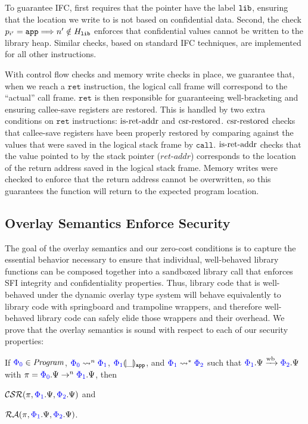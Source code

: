 To guarantee IFC, \redOstore{} first requires that the pointer have the label
$\mathtt{lib}$, ensuring that the location we write to is not based on confidential
data.
%
Second, the check $p_{i'} = \mathtt{app} \Longrightarrow n' \notin H_{\mathtt{lib}}$
enforces that confidential values cannot be written to the library heap.
%
Similar checks, based on standard IFC techniques, are implemented for all other
instructions.

%
With control flow checks and memory write checks in place, we guarantee that,
when we reach a $\mathtt{ret}$ instruction, the logical call frame will
correspond to the ``actual'' call frame.
%
$\mathtt{ret}$ is then responsible for guaranteeing well-bracketing and ensuring
callee-save registers are restored.
%
This is handled by two extra conditions on $\mathtt{ret}$ instructions:
$\operatorname{is-ret-addr}$ and $\operatorname{csr-restored}$.
%
$\operatorname{csr-restored}$ checks that callee-save registers have been
properly restored by comparing against the values that were saved in the
logical stack frame by $\mathtt{call}$.
%
$\operatorname{is-ret-addr}$ checks that the value pointed to by the stack pointer
($\mathit{ret\mbox{-}addr}$) corresponds to the location of the return address
saved in the logical stack frame.
%
Memory writes were checked to enforce that the return address cannot be
overwritten, so this guarantees the function will return to the expected program
location.

\subsection{Overlay Semantics Enforce Security}
\label{sec:overlay:secure}

The goal of the overlay semantics and our zero-cost conditions is to capture the
essential behavior necessary to ensure that individual, well-behaved library
functions can be composed together into a sandboxed library call that enforces
SFI integrity and confidentiality properties.
%
Thus, library code that is well-behaved under the dynamic overlay type system
will behave equivalently to library code with springboard and trampoline
wrappers, and therefore well-behaved library code can safely elide those
wrappers and their overhead.
%
We prove that the overlay semantics is sound with respect to each of our
security properties:
%
\begin{theorem} \label{thm:overlay-integrity-soundness}
  If ${\color{blue}{\Phi_0}} \in \mathit{Program}$, ${\color{blue}{\Phi_0}} \mathrel{\mathrel{\leadsto}^{n}} {\color{blue}{\Phi_1}}$,
  ${{\color{blue}{\Phi_1}}}\llparenthesis{\_}\rrparenthesis_{\mathtt{app}}$, and
  ${\color{blue}{\Phi_1}} \mathrel{\mathrel{\leadsto}^{\ast}} {\color{blue}{\Phi_2}}$ such that ${\color{blue}{\Phi_1}}.\Psi \mathrel{\xrightarrow{\!\text{wb}}}
  {\color{blue}{\Phi_2}}.\Psi$ with $\pi = {\color{blue}{\Phi_0}}.\Psi \mathrel{\mathrel{\rightarrow}^{n}} {\color{blue}{\Phi_1}}.\Psi$, then
  \begin{enumerate*}
  \item $\mathcal{CSR}(\pi, {\color{blue}{\Phi_1}}.\Psi, {\color{blue}{\Phi_2}}.\Psi)$ and
  \item $\mathcal{RA}(\pi, {\color{blue}{\Phi_1}}.\Psi, {\color{blue}{\Phi_2}}.\Psi)$.
  \end{enumerate*}
\end{theorem}

